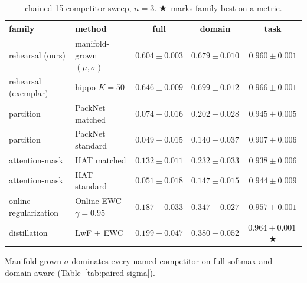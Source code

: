 \documentclass[11pt]{article}
\newcommand{\headline}{$\bigstar$}
\begin{document}
\begin{table}[h]
  \centering
  \caption{chained-15 competitor sweep, $n = 3$. \headline\ marks family-best on a metric.}
  \label{tab:competitor-sweep}
  \small
  \begin{tabular}{llccc}
    \toprule
    family                  & method                       & full              & domain            & task              \\
    \midrule
    rehearsal (ours)        & manifold-grown $(\mu,\sigma)$ & $0.604 \pm 0.003$ & $0.679 \pm 0.010$ & $0.960 \pm 0.001$ \\
    rehearsal (exemplar)    & hippo $K = 50$               & $0.646 \pm 0.009$ & $0.699 \pm 0.012$ & $0.966 \pm 0.001$ \\
    partition               & PackNet matched              & $0.074 \pm 0.016$ & $0.202 \pm 0.028$ & $0.945 \pm 0.005$ \\
    partition               & PackNet standard             & $0.049 \pm 0.015$ & $0.140 \pm 0.037$ & $0.907 \pm 0.006$ \\
    attention-mask          & HAT matched                  & $0.132 \pm 0.011$ & $0.232 \pm 0.033$ & $0.938 \pm 0.006$ \\
    attention-mask          & HAT standard                 & $0.051 \pm 0.018$ & $0.147 \pm 0.015$ & $0.944 \pm 0.009$ \\
    online-regularization   & Online EWC $\gamma = 0.95$   & $0.187 \pm 0.033$ & $0.347 \pm 0.027$ & $0.957 \pm 0.001$ \\
    distillation            & LwF $+$ EWC                  & $0.199 \pm 0.047$ & $0.380 \pm 0.052$ & $0.964 \pm 0.001$\,\headline \\
    \bottomrule
  \end{tabular}
\end{table}

Manifold-grown $\sigma$-dominates every named competitor on full-softmax
and domain-aware (Table~\ref{tab:paired-sigma}).
\end{document}
